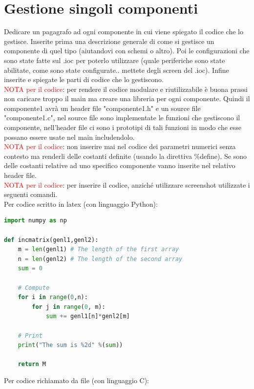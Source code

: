 \documentclass[11pt]{report}
\begin{document}
\section{Gestione singoli componenti}
Dedicare un pagagrafo ad ogni componente in cui viene spiegato il codice che lo gestisce. Inserite prima una descrizione generale di come si gestisce un componente di quel tipo (aiutandovi con schemi o altro). Poi le configurazioni che sono state fatte sul .ioc per poterlo utilizzare (quale periferiche sono state abilitate, come sono state configurate.. mettete degli screen del .ioc). Infine inserite e spiegate le parti di codice che lo gestiscono.\\
\newline
\textcolor{red}{NOTA per il codice}: per rendere il codice modulare e riutilizzabile è buona prassi non caricare troppo il main ma creare una libreria per ogni componente. Quindi il componente1 avrà un header file "componente1.h" e un source file "componente1.c", nel source file sono implementate le funzioni che gestiscono il componente, nell'header file ci sono i prototipi di tali funzioni in modo che esse possano essere usate nel main includendolo.\\
\newline
\textcolor{red}{NOTA per il codice}: non inserire mai nel codice dei parametri numerici senza contesto ma renderli delle costanti definite (usando la direttiva \%define). Se sono delle costanti relative ad uno specifico componente vanno inserite nel relativo header file.\\
\newline
\textcolor{red}{NOTA per il codice}: per inserire il codice, anziché utilizzare screenshot utilizzate i seguenti comandi.\\
Per codice scritto in latex (con linguaggio Python):
\begin{lstlisting}[language=Python, caption="Codice in Python"]
import numpy as np
    
def incmatrix(genl1,genl2):
    m = len(genl1) # The length of the first array
    n = len(genl2) # The length of the second array
    sum = 0
    
    # Compute 
    for i in range(0,n):
        for j in range(0, m):
            sum += genl1[n]*genl2[m]

    # Print
    print("The sum is %2d" %(sum))   
    
    return M
\end{lstlisting}
Per codice richiamato da file (con linguaggio C):
\end{document}
